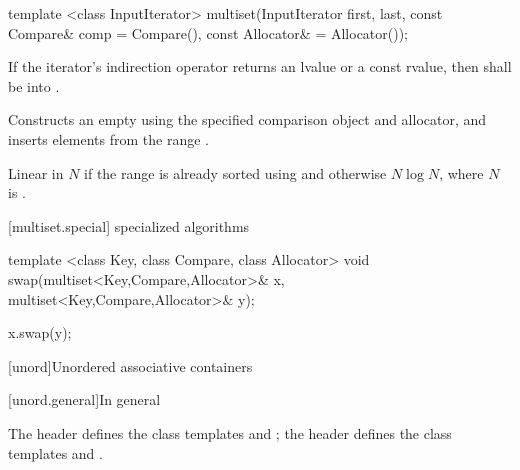 %
%
\begin{itemdecl}
template <class InputIterator>
  multiset(InputIterator first, last,
           const Compare& comp = Compare(), const Allocator& = Allocator());
\end{itemdecl}

\begin{itemdescr}
\pnum
\requires If the iterator's indirection operator returns an lvalue or a
const rvalue, then  shall be
 into .

\pnum
\effects
Constructs an empty
using the specified comparison object and allocator,
and inserts elements from the range
.

\pnum
\complexity
Linear in $N$
if the range
is already sorted using  and otherwise $N \log{N}$,
where $N$ is
.
\end{itemdescr}

[multiset.special]{ specialized algorithms}

%
%
\begin{itemdecl}
template <class Key, class Compare, class Allocator>
  void swap(multiset<Key,Compare,Allocator>& x,
            multiset<Key,Compare,Allocator>& y);
\end{itemdecl}

\begin{itemdescr}
\pnum
\effects
\begin{codeblock}
x.swap(y);
\end{codeblock}
\end{itemdescr}

[unord]{Unordered associative containers}

[unord.general]{In general}

\pnum
The header  defines the class templates
 and
; the header  defines the class templates
 and .

